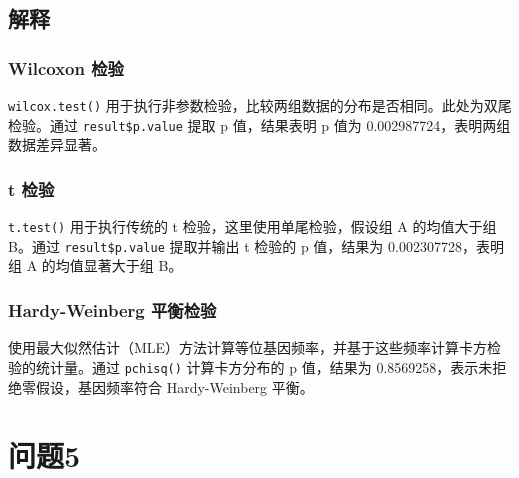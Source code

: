 \documentclass[UTF8]{report}
\theoremstyle{MyLineTheoremStyle} %
\theoremstyle{MyBlockTheoremStyle} %
\theoremstyle{MySubsubsectionStyle} %
\begin{document}
\section*{解释}

\subsection*{Wilcoxon 检验}

\texttt{wilcox.test()} 用于执行非参数检验，比较两组数据的分布是否相同。此处为双尾检验。通过 \texttt{result\$p.value} 提取 p 值，结果表明 p 值为 0.002987724，表明两组数据差异显著。

\subsection*{t 检验}

\texttt{t.test()} 用于执行传统的 t 检验，这里使用单尾检验，假设组 A 的均值大于组 B。通过 \texttt{result\$p.value} 提取并输出 t 检验的 p 值，结果为 0.002307728，表明组 A 的均值显著大于组 B。

\subsection*{Hardy-Weinberg 平衡检验}

使用最大似然估计（MLE）方法计算等位基因频率，并基于这些频率计算卡方检验的统计量。通过 \texttt{pchisq()} 计算卡方分布的 p 值，结果为 0.8569258，表示未拒绝零假设，基因频率符合 Hardy-Weinberg 平衡。










\chapter{问题5}
\end{document}
